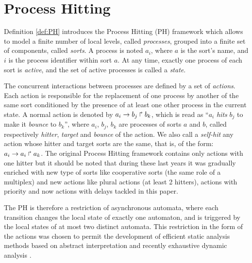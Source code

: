 
\section{Process Hitting}
\label{sec:ph}

Definition \ref{def:PH} introduces the Process Hitting (PH) framework \cite{PMR10-TCSB}
which allows to model a finite number of local levels,
called \emph{processes},
grouped into a finite set of components, called \emph{sorts}.
A process is noted $a_i$, where $a$ is the sort's name,
and $i$ is the process identifier within sort $a$.
At any time, exactly one process of each sort is \emph{active},
and the set of active processes is called a \emph{state}.

The concurrent interactions between processes are defined by a set of \emph{actions}.
Each action is responsible for the replacement of one process by another of the same sort
conditioned by the presence of at least one other process in the current state.
A normal action is denoted by $a_i\rightarrow b_j\Rsh b_k$, which is read as
“$a_i$ \emph{hits} $b_j$ to make it \emph{bounce} to $b_k$”,
where $a_i$, $b_j$, $b_k$ are processes of sorts $a$ and $b$,
called respectively \emph{hitter}, \emph{target} and
\emph{bounce} of the action. 
We also call a \emph{self-hit} any action whose hitter and target sorts are the same,
that is, of the form: $a_i\rightarrow a_i\Rsh a_k$. The original Process Hitting framework contains only actions with one hitter but it should be noted that during these last years it was gradually enriched with new type of sorts like cooperative sorts (the same role of a multiplex) and new actions like plural actions \cite{folschette-phd-14} (at least 2 hitters), actions with priority \cite{FPMR13-CS2Bio} and now actions with delays tackled in this paper.

The PH is therefore a restriction of asynchronous automata, where each transition
changes the local state of exactly one automaton,
and is triggered by the local states of at most two distinct automata.
This restriction in the form of the actions was chosen to permit
the development of efficient static analysis methods
based on abstract interpretation \cite{PMR12-MSCS} and recently exhaustive dynamic analysis \cite{benabdallah2015}.


